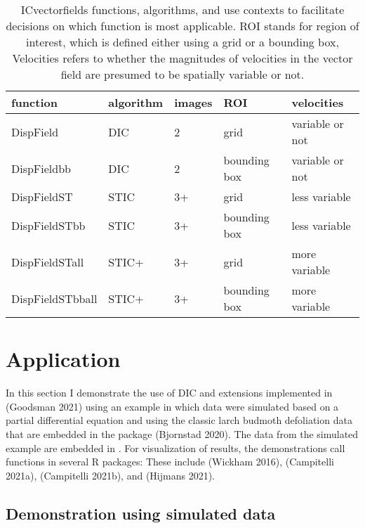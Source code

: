 \begin{table}

\caption{\label{tab:function-table-tex}ICvectorfields functions, algorithms, and use contexts to facilitate decisions on which function is most applicable. ROI stands for region of interest, which is defined either using a grid or a bounding box, Velocities refers to whether the magnitudes of velocities in the vector field are presumed to be spatially variable or not.}
\centering
\begin{tabular}[t]{l|l|l|l|l}
\hline
function & algorithm & images & ROI & velocities\\
\hline
DispField & DIC & 2 & grid & variable or not\\
\hline
DispFieldbb & DIC & 2 & bounding box & variable or not\\
\hline
DispFieldST & STIC & 3+ & grid & less variable\\
\hline
DispFieldSTbb & STIC & 3+ & bounding box & less variable\\
\hline
DispFieldSTall & STIC+ & 3+ & grid & more variable\\
\hline
DispFieldSTbball & STIC+ & 3+ & bounding box & more variable\\
\hline
\end{tabular}
\end{table}

\hypertarget{application}{%
\section{Application}\label{application}}

In this section I demonstrate the use of DIC and extensions implemented in  (Goodsman 2021) using an example in which data were simulated based on a partial differential equation and using the classic larch budmoth defoliation data that are embedded in the  package (Bjornstad 2020). The data from the simulated example are embedded in . For visualization of results, the demonstrations call functions in several R packages: These include  (Wickham 2016),  (Campitelli 2021a),  (Campitelli 2021b), and  (Hijmans 2021).

\hypertarget{demonstration-using-simulated-data}{%
\subsection{Demonstration using simulated data}\label{demonstration-using-simulated-data}}

